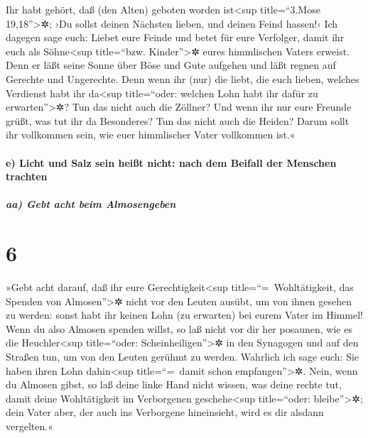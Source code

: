  Ihr habt gehört, daß (den Alten) geboten worden
ist\textless sup title=``3.Mose 19,18''\textgreater✲; ›Du sollst deinen
Nächsten lieben, und deinen Feind hassen!‹  Ich dagegen
sage euch: Liebet eure Feinde und betet für eure Verfolger,
 damit ihr euch als Söhne\textless sup title=``bzw.
Kinder''\textgreater✲ eures himmlischen Vaters erweist. Denn er läßt
seine Sonne über Böse und Gute aufgehen und läßt regnen auf Gerechte und
Ungerechte.  Denn wenn ihr (nur) die liebt, die euch
lieben, welches Verdienst habt ihr da\textless sup title=``oder: welchen
Lohn habt ihr dafür zu erwarten''\textgreater✲? Tun das nicht auch die
Zöllner?  Und wenn ihr nur eure Freunde grüßt, was tut
ihr da Besonderes? Tun das nicht auch die Heiden?  Darum
sollt ihr vollkommen sein, wie euer himmlischer Vater vollkommen ist.«

\hypertarget{e-licht-und-salz-sein-heiuxdft-nicht-nach-dem-beifall-der-menschen-trachten}{%
\paragraph{e) Licht und Salz sein heißt nicht: nach dem Beifall der
Menschen
trachten}\label{e-licht-und-salz-sein-heiuxdft-nicht-nach-dem-beifall-der-menschen-trachten}}

\hypertarget{aa-gebt-acht-beim-almosengeben}{%
\subparagraph{aa) Gebt acht beim
Almosengeben}\label{aa-gebt-acht-beim-almosengeben}}

\hypertarget{section-5}{%
\section{6}\label{section-5}}

 »Gebt acht darauf, daß ihr eure
Gerechtigkeit\textless sup title=``=~Wohltätigkeit, das Spenden von
Almosen''\textgreater✲ nicht vor den Leuten ausübt, um von ihnen gesehen
zu werden: sonst habt ihr keinen Lohn (zu erwarten) bei eurem Vater im
Himmel!  Wenn du also Almosen spenden willst, so laß nicht
vor dir her posaunen, wie es die Heuchler\textless sup title=``oder:
Scheinheiligen''\textgreater✲ in den Synagogen und auf den Straßen tun,
um von den Leuten gerühmt zu werden. Wahrlich ich sage euch: Sie haben
ihren Lohn dahin\textless sup title=``=~damit schon
empfangen''\textgreater✲.  Nein, wenn du Almosen gibst, so
laß deine linke Hand nicht wissen, was deine rechte tut, 
damit deine Wohltätigkeit im Verborgenen geschehe\textless sup
title=``oder: bleibe''\textgreater✲; dein Vater aber, der auch ins
Verborgene hineinsieht, wird es dir alsdann vergelten.«

